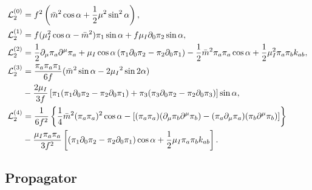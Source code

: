 \begin{align}
\mathcal{L}_2^{(0)}
&  =
    f^2   
    \left(
        \bar m^2 \cos{\alpha}
        + \frac{1}{2} \mu^2 \sin^2{\alpha}
    \right),
    \label{L0}
\\
\label{L1}
\mathcal{L}_2^{(1)}
& =
    f 
    (
        \mu_I^2\cos{\alpha}
        - \bar m^2
    ) \pi_1 \sin{\alpha}
    + f \mu_I \partial_0\pi_2 \sin{\alpha},
\\
\mathcal{L}_2^{(2)}
& =
    \frac{1}{2} \partial_\mu\pi_a\partial^\mu\pi_a
    + \mu_I \cos{\alpha} \left( \pi_1 \partial_0\pi_2 - \pi_2\partial_0\pi_1 \right)
    - \frac{1}{2} \bar m^2 \pi_a \pi_a \cos{\alpha}
    + \frac{1}{2} \mu_I ^2 \pi_a \pi_b k_{ab},
\label{L2}
\\
\notag
\mathcal{L}_2^{(3)}
& =
    \frac{\pi_a\pi_a \pi_1}{6f}
    (\bar m^2 \sin{\alpha}-2\mu_I{}^2 \sin{2\alpha})\\ \label{L3}
    &
    -
    \frac{2 \mu_I}{3 f}
    \left[
        \pi_1(\pi_1 \partial_0\pi_2 - \pi_2\partial_0\pi_1)
        +
        \pi_3(\pi_3\partial_0\pi_2-\pi_2 \partial_0\pi_3)
    \right]
    \sin{\alpha},
\\
\notag
\mathcal{L}_2^{(4)}
& =
\frac{1}{6f^2}
\left\{ 
    \frac{1}{4} \bar m^2 (\pi_a\pi_a)^2 \cos{\alpha}
    -
    \left[
        (\pi_a \pi_a) (\partial_\mu \pi_b \partial^\mu \pi_b )
        - (\pi_a \partial_\mu \pi_a)(\pi_b \partial^\mu \pi_b )
    \right]
 \right\}
\\
&
- \frac{\mu_I \pi_a\pi_a}{3f^2}
\left[
    \left(\pi_1\partial_0 \pi_2 - \pi_2 \partial_0 \pi_1\right)
    \cos{\alpha}
    + \frac{1}{2} \mu_I \pi_a \pi_b k_{ab}
\right].
\label{L4}
\end{align}
%



\subsection{Propagator}
\label{section: propagator}

